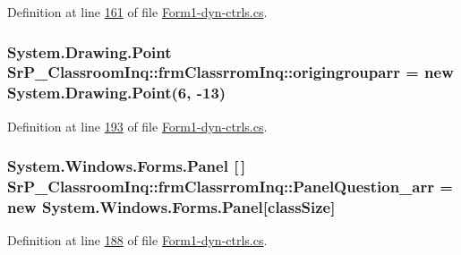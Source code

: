\-Definition at line \hyperlink{_form1-dyn-ctrls_8cs_source_l00161}{161} of file \hyperlink{_form1-dyn-ctrls_8cs_source}{\-Form1-\/dyn-\/ctrls.\-cs}.

\hypertarget{class_sr_p___classroom_inq_1_1frm_classrrom_inq_ace01ba3289e75624d67b90f742c195f5}{
\subsubsection[{origingrouparr}]{\setlength{\rightskip}{0pt plus 5cm}\-System.\-Drawing.\-Point {\bf \-Sr\-P\-\_\-\-Classroom\-Inq\-::frm\-Classrrom\-Inq\-::origingrouparr} = new \-System.\-Drawing.\-Point(6, -\/13)}}
\label{class_sr_p___classroom_inq_1_1frm_classrrom_inq_ace01ba3289e75624d67b90f742c195f5}


\-Definition at line \hyperlink{_form1-dyn-ctrls_8cs_source_l00193}{193} of file \hyperlink{_form1-dyn-ctrls_8cs_source}{\-Form1-\/dyn-\/ctrls.\-cs}.

\hypertarget{class_sr_p___classroom_inq_1_1frm_classrrom_inq_a5c89025435cd16c638fbc91999b74f80}{
\subsubsection[{\-Panel\-Question\-\_\-arr}]{\setlength{\rightskip}{0pt plus 5cm}\-System.\-Windows.\-Forms.\-Panel \mbox{[}$\,$\mbox{]} {\bf \-Sr\-P\-\_\-\-Classroom\-Inq\-::frm\-Classrrom\-Inq\-::\-Panel\-Question\-\_\-arr} = new \-System.\-Windows.\-Forms.\-Panel\mbox{[}{\bf class\-Size}\mbox{]}}}
\label{class_sr_p___classroom_inq_1_1frm_classrrom_inq_a5c89025435cd16c638fbc91999b74f80}


\-Definition at line \hyperlink{_form1-dyn-ctrls_8cs_source_l00188}{188} of file \hyperlink{_form1-dyn-ctrls_8cs_source}{\-Form1-\/dyn-\/ctrls.\-cs}.

